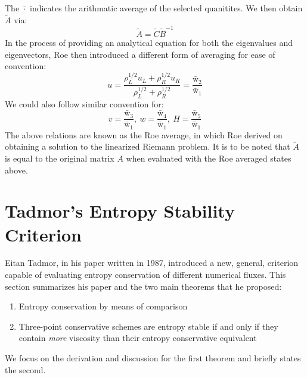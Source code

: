 \documentclass[a4paper]{article}
\numberwithin{equation}{section}
\begin{document}
The $\bar{\cdot}$ indicates the arithmatic average of the selected quanitites. We then obtain $\tilde{A}$ via:
\begin{equation}
    \tilde{A} = \tilde{C}\tilde{B}^{-1}
\end{equation}
In the process of providing an analytical equation for both the eigenvalues and eigenvectors, Roe then introduced a different form of averaging for ease of convention:
\begin{equation}
    u = \frac{\rho^{1/2}_L u_L + \rho^{1/2}_R u_R}{\rho_L^{1/2} + \rho_R^{1/2}} = \frac{\bar{\mathrm{w}}_2}{\bar{\mathrm{w}}_1}
\end{equation}
We could also follow similar convention for:
\begin{equation}
    v = \frac{\bar{\mathrm{w}}_3}{\bar{\mathrm{w}}_1}, \ w = \frac{\bar{\mathrm{w}}_4}{\bar{\mathrm{w}}_1}, \ H = \frac{\bar{\mathrm{w}}_5}{\bar{\mathrm{w}}_1}
\end{equation}
The above relations are known as the Roe average, in which Roe derived on obtaining a solution to the linearized Riemann problem. It is to be noted that $\tilde{A}$ is equal to the original matrix $A$ when evaluated with the Roe averaged states above. 
\section{Tadmor's Entropy Stability Criterion}
Eitan Tadmor, in his paper written in 1987, introduced a new, general, criterion capable of evaluating entropy conservation of different numerical fluxes. This section summarizes his paper and the two main theorems that he proposed:
\begin{enumerate}
    \item Entropy conservation by means of comparison
    \item Three-point conservative schemes are entropy stable if and only if they contain \textit{more} viscosity than their entropy conservative equivalent
\end{enumerate}
We focus on the derivation and discussion for the first theorem and briefly states the second.

\end{document}
